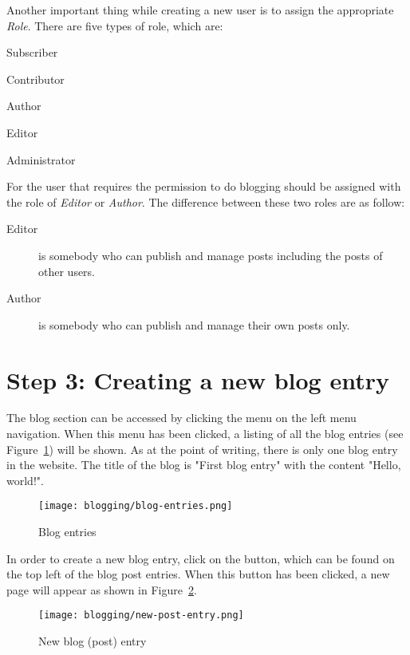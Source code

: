 Another important thing while creating a new user is to assign the appropriate \emph{Role}. There are five types of role, which are:
\begin{itemize*}
\item Subscriber
\item Contributor
\item Author
\item Editor
\item Administrator
\end{itemize*}

For the user that requires the permission to do blogging should be assigned with the role of \emph{Editor} or \emph{Author}. The difference \cite{wp-user-roles} between these two roles are as follow:
\begin{description}
\item[Editor] is somebody who can publish and manage posts including the posts of other users.
\item[Author] is somebody who can publish and manage their own posts only.
\end{description}

\section*{Step 3: Creating a new blog entry}
The blog section can be accessed by clicking the  menu on the left menu navigation. When this menu has been clicked, a listing of all the blog entries (see Figure~\ref{fig:blog-entries}) will be shown. As at the point of writing, there is only one blog entry in the website. The title of the blog is "First blog entry" with the content "Hello, world!".

\begin{figure}[ht]
\caption{Blog entries}
\label{fig:blog-entries}
\centering
\texttt{[image: blogging/blog-entries.png]}
\end{figure}

In order to create a new blog entry, click on the  button, which can be found on the top left of the blog post entries. When this button has been clicked, a new page will appear as shown in Figure~\ref{fig:new-post-entry}.

\begin{figure}[ht]
\caption{New blog (post) entry}
\label{fig:new-post-entry}
\centering
\texttt{[image: blogging/new-post-entry.png]}
\end{figure}

